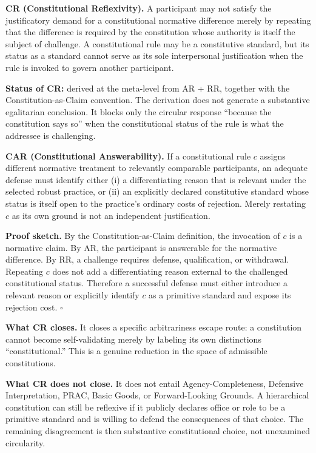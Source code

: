 \documentclass[11pt]{article}
\def\ensuremath#1{#1}%
\def\mathrm#1{#1}%
\newcommand{\CR}{\ensuremath{\mathrm{CR}}}
\newcommand{\CAR}{\ensuremath{\mathrm{CAR}}}
\begin{document}
\begin{paperbox}
\textbf{\CR{} (Constitutional Reflexivity).} A participant may not satisfy the justificatory demand for a constitutional normative difference merely by repeating that the difference is required by the constitution whose authority is itself the subject of challenge. A constitutional rule may be a constitutive standard, but its status as a standard cannot serve as its sole interpersonal justification when the rule is invoked to govern another participant.
\end{paperbox}

\textbf{Status of \CR{}:} derived at the meta-level from AR + RR, together with the Constitution-as-Claim convention. The derivation does not generate a substantive egalitarian conclusion. It blocks only the circular response ``because the constitution says so'' when the constitutional status of the rule is what the addressee is challenging.

\begin{paperbox}
\textbf{\CAR{} (Constitutional Answerability).} If a constitutional rule $c$ assigns different normative treatment to relevantly comparable participants, an adequate defense must identify either (i) a differentiating reason that is relevant under the selected robust practice, or (ii) an explicitly declared constitutive standard whose status is itself open to the practice's ordinary costs of rejection. Merely restating $c$ as its own ground is not an independent justification.
\end{paperbox}

\textbf{Proof sketch.} By the Constitution-as-Claim definition, the invocation of $c$ is a normative claim. By AR, the participant is answerable for the normative difference. By RR, a challenge requires defense, qualification, or withdrawal. Repeating $c$ does not add a differentiating reason external to the challenged constitutional status. Therefore a successful defense must either introduce a relevant reason or explicitly identify $c$ as a primitive standard and expose its rejection cost. \hfill$\square$

\textbf{What \CR{} closes.} It closes a specific arbitrariness escape route: a constitution cannot become self-validating merely by labeling its own distinctions ``constitutional.'' This is a genuine reduction in the space of admissible constitutions.

\textbf{What \CR{} does not close.} It does not entail Agency-Completeness, Defensive Interpretation, PRAC, Basic Goods, or Forward-Looking Grounds. A hierarchical constitution can still be reflexive if it publicly declares office or role to be a primitive standard and is willing to defend the consequences of that choice. The remaining disagreement is then substantive constitutional choice, not unexamined circularity.
\end{document}
